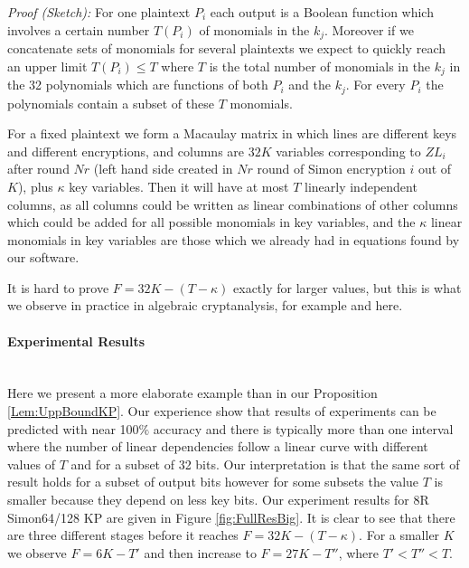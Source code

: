 \vskip-5pt
\noindent\emph{Proof (Sketch):}
For one plaintext $P_i$ each output is a Boolean function
which involves a certain number $T(P_i)$ of monomials in the $k_j$.
Moreover if we concatenate sets of monomials for several plaintexts
we expect to quickly reach an upper limit $T(P_i)\leq T$ where $T$
is the total number of monomials in the $k_j$ in the 32 polynomials
which are functions of both $P_i$ and the $k_j$.
For every $P_i$ the polynomials contain a subset of these $T$ monomials. 

For a fixed plaintext we form a Macaulay matrix
in which lines are different keys and different encryptions,
and columns are $32 K$ variables corresponding to $ZL_i$ after round $Nr$
(left hand side created in $Nr$ round of Simon encryption $i$ out of $K$),
plus $\kappa$ key variables.
Then it will have at most $T$ linearly independent columns,
as all columns could be written as linear combinations of other columns
which could be added for all possible monomials in key variables, and
the $\kappa$ linear monomials in key variables are those which we already had
in equations found by our software.

It is hard to prove $F=32 K - (T-\kappa)$ exactly for larger values, but this is what we observe in practice in algebraic cryptanalysis, for example \cite{XL2} and here. 

\paragraph{Experimental Results} \mbox{} \\
Here we present a more elaborate example than in our Proposition \ref{Lem:UppBoundKP}. 
Our experience show that results of experiments can be predicted with near 100$\%$ accuracy and 
there is typically more than one interval where the number of linear dependencies follow a linear curve 
with different values of $T$ and for a subset of 32 bits. Our interpretation is that 
the same sort of result holds for a subset of output bits however for some subsets the value $T$ is smaller because they depend on less key bits.
Our experiment results for 8R Simon64/128 KP are given in Figure \ref{fig:FullResBig}. It is clear to see that there are three different stages before it reaches $F = 32 K - (T-\kappa)$. For a smaller $K$ we observe $F = 6K - T'$ and then increase to $F = 27K - T''$, where $T'<T''<T$.

